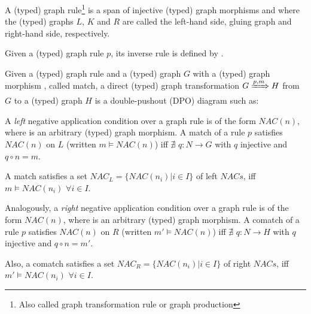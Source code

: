 \begin{definition} A (typed) graph rule\footnote{Also called graph transformation rule or graph production} \graphrule{} is a span of injective (typed) graph morphisms \lefthand{} and \righthand{}  where the (typed) graphs $L$, $K$ and $R$ are called the left-hand side, gluing graph and right-hand side, respectively.

  Given a (typed) graph rule $p$, its inverse rule is defined by \inversegraphrule.
\end{definition}

\begin{definition} Given a (typed) graph rule \graphrule{} and a (typed) graph $G$ with a (typed) graph morphism \match, called match, a direct (typed) graph transformation $G \xRightarrow{p,m} H$ from $G$ to a (typed) graph $H$ is a double-pushout (DPO) diagram such as:
  

\end{definition}

\begin{definition} A \emph{left} negative application condition over a graph rule \graphrule{} is of the form $NAC(n)$, where \nac{} is an arbitrary  (typed) graph morphism. A match \match{} of a rule $p$ satisfies $NAC(n)$ on $L$ (written $m \models NAC(n)$) iff $\nexists$ $q : N \rightarrow G$ with $q$ injective and $q \circ n = m$.


  A match \match{} satisfies a set \mbox{$NAC_L = \{NAC(n_i)|i \in I\}$} of left $NACs$, iff \mbox{$m \models NAC(n_i)$} $\forall i \in I$.

  Analogously, a \emph{right} negative application condition over a graph rule \graphrule{} is of the form $NAC(n)$, where \rightnac{} is an arbitrary (typed) graph morphism. A comatch \comatch{} of a rule $p$ satisfies $NAC(n)$ on $R$ (written \mbox{$m' \models NAC(n)$}) iff $\nexists$ $q : N \rightarrow H$ with $q$ injective and $q \circ n = m'$.

  Also, a comatch \comatch{} satisfies a set \mbox{$NAC_R = \{NAC(n_i)|i \in I\}$} of right $NACs$, iff $m' \models NAC(n_i)$ $\forall i \in I$.

\end{definition}

